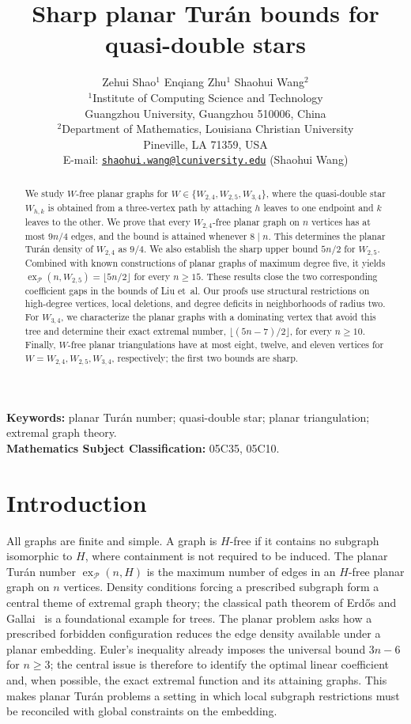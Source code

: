 \documentclass[11pt,a4paper]{article}
\title{Sharp planar Tur\'an bounds  for quasi-double stars}
\author{Zehui Shao$^{1}$ \quad Enqiang Zhu$^{1}$ \quad Shaohui Wang$^{2}$\\[0.3em]
\small $^{1}$Institute of Computing Science and Technology\\
\small Guangzhou University, Guangzhou 510006, China\\
\small $^{2}$Department of Mathematics, Louisiana Christian University\\
\small Pineville, LA 71359, USA\\
\small E-mail: \href{mailto:shaohui.wang@lcuniversity.edu}{\texttt{shaohui.wang@lcuniversity.edu}} (Shaohui Wang)}
\date{}
\theoremstyle{remark}
\newcommand{\ex}{\operatorname{ex}}
\newcommand{\PP}{\mathcal P}
\begin{document}
\maketitle
\vspace{-1.5em}
\begin{abstract}
We study $W$-free planar graphs for $W\in\{W_{2,4},W_{2,5},W_{3,4}\}$, where the quasi-double star $W_{h,k}$ is obtained from a three-vertex path by attaching $h$ leaves to one endpoint and $k$ leaves to the other. We prove that every $W_{2,4}$-free planar graph on $n$ vertices has at most $9n/4$ edges, and the bound is attained whenever $8\mid n$. This determines the planar Tur\'an density of $W_{2,4}$ as $9/4$. We also establish the sharp upper bound $5n/2$ for $W_{2,5}$. Combined with known constructions of planar graphs of maximum degree five, it yields $\ex_{\PP}(n,W_{2,5})=\lfloor5n/2\rfloor$ for every $n\ge15$. These results close the two corresponding coefficient gaps in the bounds of Liu et~al. Our proofs use structural restrictions on high-degree vertices, local deletions, and degree deficits in neighborhoods of radius two. For $W_{3,4}$, we characterize the planar graphs with a dominating vertex that avoid this tree and determine their exact extremal number, $\lfloor(5n-7)/2\rfloor$, for every $n\ge10$. Finally, $W$-free planar triangulations have at most eight, twelve, and eleven vertices for $W=W_{2,4},W_{2,5},W_{3,4}$, respectively; the first two bounds are sharp.
\end{abstract}
\noindent\textbf{Keywords:} planar Tur\'an number; quasi-double star; planar triangulation; extremal graph theory.\\
\textbf{Mathematics Subject Classification:} 05C35, 05C10.

\section{Introduction}

All graphs are finite and simple. A graph is $H$-free if it contains no subgraph isomorphic to $H$, where containment is not required to be induced. The planar Tur\'an number $\ex_{\PP}(n,H)$ is the maximum number of edges in an $H$-free planar graph on $n$ vertices. Density conditions forcing a prescribed subgraph form a central theme of extremal graph theory; the classical path theorem of Erd\H{o}s and Gallai~\cite{ErdosGallai1959} is a foundational example for trees. The planar problem asks how a prescribed forbidden configuration reduces the edge density available under a planar embedding. Euler's inequality already imposes the universal bound $3n-6$ for $n\ge3$; the central issue is therefore to identify the optimal linear coefficient and, when possible, the exact extremal function and its attaining graphs. This makes planar Tur\'an problems a setting in which local subgraph restrictions must be reconciled with global constraints on the embedding.
\end{document}
